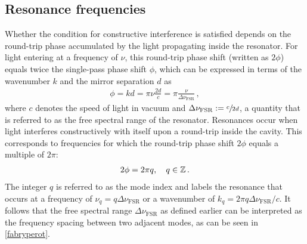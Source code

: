 \documentclass[../Thesis-IJspeert.tex]{subfiles}
\begin{document}
\subsection{Resonance frequencies}
Whether the condition for constructive interference is satisfied depends on the round-trip phase accumulated by the light propagating inside the resonator. For light entering at a frequency of $\nu$, this round-trip phase shift (written as $2\phi$) equals twice the single-pass phase shift $\phi$, which can be expressed in terms of the wavenumber $k$ and the mirror separation $d$ as
\begin{align}
	\label{phiairy}
	\phi=kd=\pi\nu\frac{2d}{c}=\pi\frac{\nu}{\Delta\nu_\mathrm{FSR}}\,,
\end{align}
where $c$ denotes the speed of light in vacuum and $\Delta\nu_\mathrm{FSR}:=\sfrac{c}{2d}$, a quantity that is referred to as the free spectral range of the resonator. Resonances occur when light interferes constructively with itself upon a round-trip inside the cavity. This corresponds to frequencies for which the round-trip phase shift $2\phi$ equals a multiple of $2\pi$:
\begin{align}
	\label{rescondition}
	2\phi=2\pi q,\quad q \in \mathbb{Z}\,.
\end{align}
The integer $q$ is referred to as the mode index and labels the resonance that occurs at a frequency of $\nu_q=q\Delta\nu_\mathrm{FSR}$ or a wavenumber of $k_q=2\pi q \Delta\nu_\mathrm{FSR}/c$. It follows that the free spectral range $\Delta\nu_\mathrm{FSR}$ as defined earlier can be interpreted as the frequency spacing between two adjacent modes, as can be seen in \autoref{fabryperot}.
\end{document}
